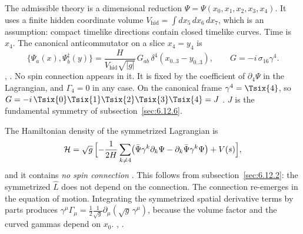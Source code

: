 The admissible theory is a dimensional reduction $\Psi=\Psi(x_0,x_1,x_2,x_3,x_4)$. It uses a finite
hidden coordinate volume $V_{\text{hid}}=\int dx_5\,dx_6\,dx_7$, which is an assumption: compact
timelike directions contain closed timelike curves. Time is $x_4$. The canonical anticommutator on
a slice $x_4=y_4$ is
\begin{equation}
  \{\Psi_a(x),\Psi^\ddagger_b(y)\}=\frac{H}{V_{\text{hid}}\sqrt{|g|}}\,G_{ab}\,\delta^4(x_{0..3}-y_{0..3}),\qquad G=-i\,\sigma_{16}\gamma^4 .
\end{equation}
 , . No spin connection appears in it. It is
fixed by the coefficient of $\partial_4\Psi$ in the Lagrangian, and $\Gamma_4=0$ in any case. On
the canonical frame $\gamma^4=\Tsix{4}$, so
$G=-i\,\Tsix{0}\Tsix{1}\Tsix{2}\Tsix{3}\Tsix{4}=J$ \cfderived. $J$ is the fundamental symmetry
of subsection~\ref{sec:6.12.6}.

The Hamiltonian density of the symmetrized Lagrangian is
\begin{equation}
  \mathcal H=\sqrt g\,\Bigl[-\frac{1}{2H}\sum_{k\neq4}\bigl(\bar\Psi\gamma^k\partial_k\Psi-\partial_k\bar\Psi\gamma^k\Psi\bigr)+V(s)\Bigr],
\end{equation}
and it contains \emph{no spin connection} 
. This follows from
subsection~\ref{sec:6.12.2}: the symmetrized $\hat L$ does not depend on the connection. The connection re-emerges
in the equation of motion. Integrating the symmetrized spatial derivative terms by parts produces
$\gamma^\mu\Gamma_\mu=\tfrac12\frac{1}{\sqrt g}\partial_\mu(\sqrt g\,\gamma^\mu)$, because the volume
factor and the curved gammas depend on $x_0$. 
, .

